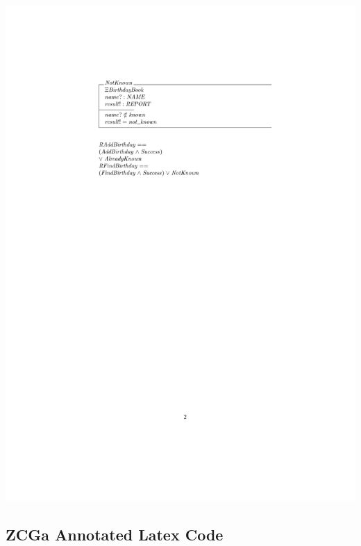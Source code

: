 \noindent \includegraphics[clip, trim=4cm 10cm 4cm 4.2cm]{examples/bb/0comp2.pdf}

%
\subsection{ZCGa Annotated Latex Code}
\label{app:bb1}

